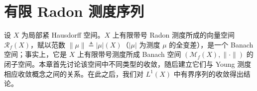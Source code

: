 \documentclass[../main.tex]{subfiles}
\begin{document}
\chapter{有限 Radon 测度序列}\label{chapter:ch05}

设 $X$ 为局部紧 Hausdorff 空间。$X$ 上有限带号 Radon 测度所成的向量空间 $\mathscr{R}_f(X)$，赋以范数 $\|\mu\|\triangleq |\mu|(X)$（$|\mu|$ 为测度 $\mu$ 的全变差），是一个 Banach 空间；事实上，它是 $X$ 上有限带号测度所成 Banach 空间 $(\mathcal{M}_f(X),\|\cdot\|)$ 的闭子空间。本章首先讨论该空间中不同类型的收敛，随后建立它们与 Young 测度相应收敛概念之间的关系。在此之后，我们对 $L^1(X)$ 中有界序列的收敛得出结论。





















\end{document}
